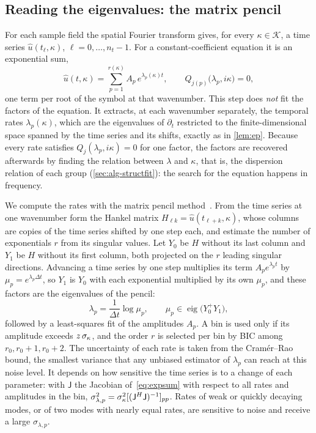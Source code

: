 \subsection{Reading the eigenvalues: the matrix pencil}\label{sec:alg-pencil}
For each sample field the spatial Fourier transform gives, for every $\kappa\in\mathcal K$, a time series
$\hat u(t_\ell,\kappa)$, $\ell=0,\dots,n_t-1$. For a constant-coefficient equation it is an exponential sum,
\begin{equation}\label{eq:expsum}
  \hat u(t,\kappa)=\sum_{p=1}^{r(\kappa)}A_p\,e^{\lambda_p(\kappa)t},\qquad Q_{j(p)}\big(\lambda_p,i\kappa\big)=0,
\end{equation}
one term per root of the symbol at that wavenumber. This step does \emph{not} fit the factors of the equation. It
extracts, at each wavenumber separately, the temporal rates $\lambda_p(\kappa)$, which are the eigenvalues of $\partial_t$
restricted to the finite-dimensional space spanned by the time series and its shifts, exactly as in \cref{lem:ep}.
Because every rate satisfies $Q_j(\lambda_p,i\kappa)=0$ for one factor, the factors are recovered afterwards by finding
the relation between $\lambda$ and $\kappa$, that is, the dispersion relation of each group (\cref{sec:alg-structfit}):
the search for the equation happens in frequency.

We compute the rates with the matrix pencil method~\cite{HuaSar90}. From the time series at one wavenumber form the Hankel matrix $H_{\ell k}=\hat u(t_{\ell+k},\kappa)$, whose columns are copies of the time series shifted by
one step each, and estimate the number of exponentials $r$ from its singular values. Let $Y_0$ be $H$ without its last
column and $Y_1$ be $H$ without its first column, both projected on the $r$ leading singular directions. Advancing a
time series by one step multiplies its term $A_pe^{\lambda_pt}$ by $\mu_p=e^{\lambda_p\Delta t}$, so $Y_1$ is $Y_0$ with
each exponential multiplied by its own $\mu_p$, and these factors are the eigenvalues of the pencil:
\begin{equation}\label{eq:pencil}
  \lambda_p=\frac{1}{\Delta t}\log\mu_p,\qquad \mu_p\in\operatorname{eig}\big(Y_0^{+}Y_1\big),
\end{equation}
followed by a least-squares fit of the amplitudes $A_p$. A bin is used only if its amplitude exceeds
$z\,\sigma_{\kappa}$, and the order $r$ is selected per bin by BIC among $r_0,r_0+1,r_0+2$. The uncertainty of each rate is
taken from the Cram\'er--Rao bound, the smallest variance that any unbiased estimator of $\lambda_p$ can reach at this
noise level. It depends on how sensitive the time series is to a change of each parameter: with $\mathsf J$ the
Jacobian of~\eqref{eq:expsum} with respect to all rates and amplitudes in the bin,
$\sigma_{\lambda,p}^2=\sigma_{\kappa}^2[(\mathsf J^H\mathsf J)^{-1}]_{pp}$. Rates of weak or quickly decaying modes, or of two modes with
nearly equal rates, are sensitive to noise and receive a large $\sigma_{\lambda,p}$.

